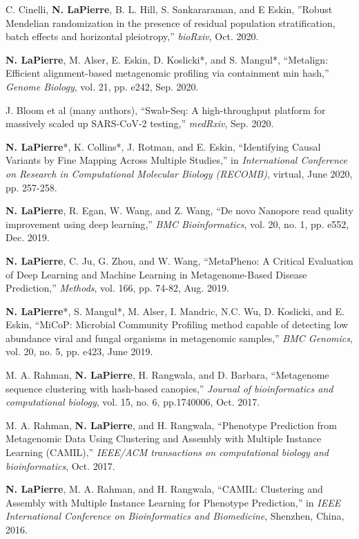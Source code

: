 \documentclass[margin, 10pt]{res} %
\begin{document}
\begin{resume}
C. Cinelli, \textbf{N. LaPierre}, B. L. Hill, S. Sankararaman, and E Eskin, ''Robust Mendelian randomization in the presence of residual population stratification, batch effects and horizontal pleiotropy,'' \emph{bioRxiv}, Oct. 2020.

\textbf{N. LaPierre}, M. Alser, E. Eskin, D. Koslicki*, and S. Mangul*, ``Metalign: Efficient alignment-based metagenomic profiling via containment min hash,'' \emph{Genome Biology}, vol. 21, pp. e242, Sep. 2020.

J. Bloom et al (many authors), ``Swab-Seq: A high-throughput platform for massively scaled up SARS-CoV-2 testing,'' \emph{medRxiv}, Sep. 2020.

\textbf{N. LaPierre}*, K. Collins*, J. Rotman, and E. Eskin, ``Identifying Causal Variants by Fine Mapping Across Multiple Studies,'' in {\sl International Conference on Research in Computational Molecular Biology (RECOMB)}, virtual, June 2020, pp. 257-258.

\textbf{N. LaPierre}, R. Egan, W. Wang, and Z. Wang, ``De novo Nanopore read quality improvement using deep learning,'' \emph{BMC Bioinformatics}, vol. 20, no. 1, pp. e552, Dec. 2019.

\textbf{N. LaPierre}, C. Ju, G. Zhou, and W. Wang, ``MetaPheno: A Critical Evaluation of Deep Learning and Machine Learning in Metagenome-Based Disease Prediction,'' \emph{Methods}, vol. 166, pp. 74-82, Aug. 2019.

\textbf{N. LaPierre}*, S. Mangul*, M. Alser, I. Mandric, N.C. Wu, D. Koslicki, and E. Eskin, ``MiCoP: Microbial Community Profiling method capable of detecting low abundance viral and fungal organisms in metagenomic samples,'' \emph{BMC Genomics}, vol. 20, no. 5, pp. e423, June 2019.

M. A. Rahman, \textbf{N. LaPierre}, H. Rangwala, and D. Barbara, ``Metagenome sequence clustering with hash-based canopies,'' \emph{Journal of bioinformatics and computational biology}, vol. 15, no. 6, pp.1740006, Oct. 2017.

M. A. Rahman, \textbf{N. LaPierre}, and H. Rangwala, ``Phenotype Prediction from Metagenomic Data Using Clustering and Assembly with Multiple Instance Learning (CAMIL),'' \emph{IEEE/ACM transactions on computational biology and bioinformatics}, Oct. 2017. 

\textbf{N. LaPierre}, M. A. Rahman, and H. Rangwala, ``CAMIL: Clustering and Assembly with Multiple Instance Learning for Phenotype Prediction,'' in {\sl IEEE International Conference on Bioinformatics and Biomedicine}, Shenzhen, China, 2016.


\end{resume}
\end{document}
